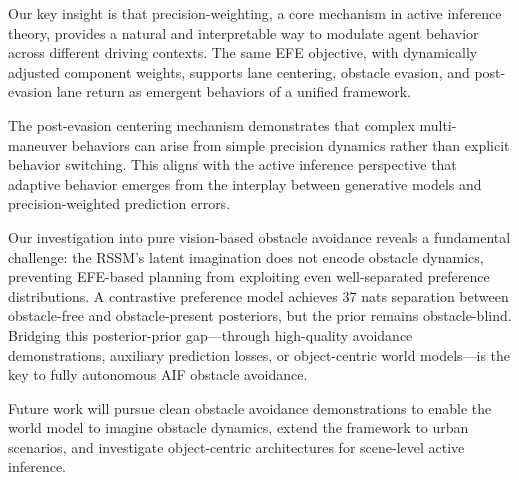 \documentclass[conference]{IEEEtran}
\begin{document}
Our key insight is that precision-weighting, a core mechanism in active inference theory, provides a natural and interpretable way to modulate agent behavior across different driving contexts. The same EFE objective, with dynamically adjusted component weights, supports lane centering, obstacle evasion, and post-evasion lane return as emergent behaviors of a unified framework.

The post-evasion centering mechanism demonstrates that complex multi-maneuver behaviors can arise from simple precision dynamics rather than explicit behavior switching. This aligns with the active inference perspective that adaptive behavior emerges from the interplay between generative models and precision-weighted prediction errors.

Our investigation into pure vision-based obstacle avoidance reveals a fundamental challenge: the RSSM's latent imagination does not encode obstacle dynamics, preventing EFE-based planning from exploiting even well-separated preference distributions. A contrastive preference model achieves 37 nats separation between obstacle-free and obstacle-present posteriors, but the prior remains obstacle-blind. Bridging this posterior-prior gap---through high-quality avoidance demonstrations, auxiliary prediction losses, or object-centric world models---is the key to fully autonomous AIF obstacle avoidance.

Future work will pursue clean obstacle avoidance demonstrations to enable the world model to imagine obstacle dynamics, extend the framework to urban scenarios, and investigate object-centric architectures for scene-level active inference.




\end{document}

